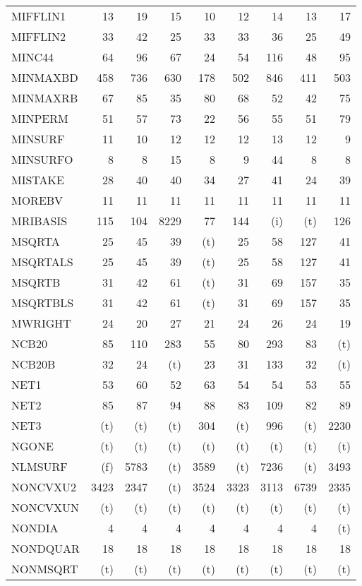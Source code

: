 \documentclass[11pt,twoside]{article}
\begin{document}
{\begin{longtable}[c]{|l|r|r|r|r|r|r|r|r|}
 MIFFLIN1 & 13 & 19 & 15 & 10 & 12 & 14 & 13 & 17 \\
 MIFFLIN2 & 33 & 42 & 25 & 33 & 33 & 36 & 25 & 49 \\
 MINC44 & 64 & 96 & 67 & 24 & 54 & 116 & 48 & 95 \\
 MINMAXBD & 458 & 736 & 630 & 178 & 502 & 846 & 411 & 503 \\
 MINMAXRB & 67 & 85 & 35 & 80 & 68 & 52 & 42 & 75 \\
 MINPERM & 51 & 57 & 73 & 22 & 56 & 55 & 51 & 79 \\
 MINSURF & 11 & 10 & 12 & 12 & 12 & 13 & 12 & 9 \\
 MINSURFO & 8 & 8 & 15 & 8 & 9 & 44 & 8 & 8 \\
 MISTAKE & 28 & 40 & 40 & 34 & 27 & 41 & 24 & 39 \\
 MOREBV & 11 & 11 & 11 & 11 & 11 & 11 & 11 & 11 \\
 MRIBASIS & 115 & 104 & 8229 & 77 & 144 & (i) & (t) & 126 \\
 MSQRTA & 25 & 45 & 39 & (t) & 25 & 58 & 127 & 41 \\
 MSQRTALS & 25 & 45 & 39 & (t) & 25 & 58 & 127 & 41 \\
 MSQRTB & 31 & 42 & 61 & (t) & 31 & 69 & 157 & 35 \\
 MSQRTBLS & 31 & 42 & 61 & (t) & 31 & 69 & 157 & 35 \\
 MWRIGHT & 24 & 20 & 27 & 21 & 24 & 26 & 24 & 19 \\
 NCB20 & 85 & 110 & 283 & 55 & 80 & 293 & 83 & (t) \\
 NCB20B & 32 & 24 & (t) & 23 & 31 & 133 & 32 & (t) \\
 NET1 & 53 & 60 & 52 & 63 & 54 & 54 & 53 & 55 \\
 NET2 & 85 & 87 & 94 & 88 & 83 & 109 & 82 & 89 \\
 NET3 & (t) & (t) & (t) & 304 & (t) & 996 & (t) & 2230 \\
 NGONE & (t) & (t) & (t) & (t) & (t) & (t) & (t) & (t) \\
 NLMSURF & (f) & 5783 & (t) & 3589 & (t) & 7236 & (t) & 3493 \\
 NONCVXU2 & 3423 & 2347 & (t) & 3524 & 3323 & 3113 & 6739 & 2335 \\
 NONCVXUN & (t) & (t) & (t) & (t) & (t) & (t) & (t) & (t) \\
 NONDIA & 4 & 4 & 4 & 4 & 4 & 4 & 4 & (t) \\
 NONDQUAR & 18 & 18 & 18 & 18 & 18 & 18 & 18 & 18 \\
 NONMSQRT & (t) & (t) & (t) & (t) & (t) & (t) & (t) & (t) \\

\end{longtable}}
\end{document}
